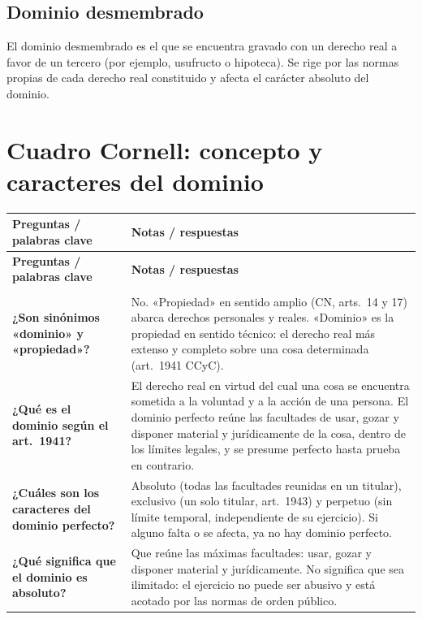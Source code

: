 \documentclass[12pt,oneside]{book}
\begin{document}
\subsection{Dominio desmembrado}

El dominio desmembrado es el que se encuentra gravado con un derecho real a favor de un tercero (por ejemplo, usufructo o hipoteca). Se rige por las normas propias de cada derecho real constituido y afecta el carácter absoluto del dominio.

\section{Cuadro Cornell: concepto y caracteres del dominio}

\begin{longtable}{
    >{\raggedright\arraybackslash}p{}
    >{\raggedright\arraybackslash}p{}
}
\toprule
\textbf{Preguntas / palabras clave} & \textbf{Notas / respuestas} \\
\midrule
\endfirsthead
\toprule
\textbf{Preguntas / palabras clave} & \textbf{Notas / respuestas} \\
\midrule
\endhead
\midrule
\multicolumn{2}{r}{\small\itshape continúa en la página siguiente} \\
\endfoot
\bottomrule
\endlastfoot

\textbf{¿Son sinónimos «dominio» y «propiedad»?} &
No. «Propiedad» en sentido amplio (CN, arts.~14 y 17) abarca derechos personales y reales. «Dominio» es la propiedad en sentido técnico: el derecho real más extenso y completo sobre una cosa determinada (art.~1941 CCyC). \\

\textbf{¿Qué es el dominio según el art.~1941?} &
El derecho real en virtud del cual una cosa se encuentra sometida a la voluntad y a la acción de una persona. El dominio perfecto reúne las facultades de usar, gozar y disponer material y jurídicamente de la cosa, dentro de los límites legales, y se presume perfecto hasta prueba en contrario. \\

\textbf{¿Cuáles son los caracteres del dominio perfecto?} &
Absoluto (todas las facultades reunidas en un titular), exclusivo (un solo titular, art.~1943) y perpetuo (sin límite temporal, independiente de su ejercicio). Si alguno falta o se afecta, ya no hay dominio perfecto. \\

\textbf{¿Qué significa que el dominio es absoluto?} &
Que reúne las máximas facultades: usar, gozar y disponer material y jurídicamente. No significa que sea ilimitado: el ejercicio no puede ser abusivo y está acotado por las normas de orden público. \\


\end{longtable}
\end{document}
